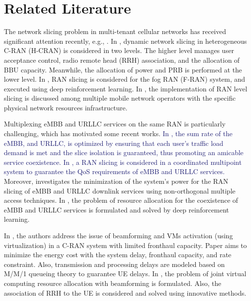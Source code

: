 \documentclass[lettersize,journal]{IEEEtran}
\begin{document}
\section{Related Literature}\label{RL}
The network slicing problem in multi-tenant cellular networks has received significant attention recently, e.g.,  \cite{feng2020dynamic,lee2018dynamic,lee2016new}.
In \cite{lee2018dynamic}, dynamic network slicing in heterogeneous C-RAN (H-CRAN) is considered in two levels. The higher level manages user acceptance control, radio remote head (RRH) association, and the allocation of BBU capacity. Meanwhile, the allocation of power and PRB is performed at the lower level.
In \cite{xiang2020realization}, RAN slicing is considered for the fog RAN (F-RAN) system, and executed using deep reinforcement learning. In \cite{elayoubi20195g,d2020toward}, the implementation of RAN level slicing is discussed among multiple mobile network operators with the specific physical network resources infrastructure.

Multiplexing eMBB and URLLC services on the same RAN is particularly challenging, which has motivated some recent works.
\textcolor{MidnightBlue}{In \cite{setayesh2020joint}, the sum rate of the eMBB, and URLLC, is optimized by ensuring that each user's traffic load demand is met and the slice isolation is guaranteed, thus promoting an amicable service coexistence.
In \cite{yang2020should}, a RAN slicing is considered in a coordinated multipoint system to guarantee the QoS requirements of eMBB and URLLC services.} Moreover, \cite{saggese2021power} investigates the minimization of the system's power for the  RAN slicing of eMBB and URLLC downlink services using non-orthogonal multiple access techniques.
In \cite{alsenwi2021intelligent}, the problem of resource allocation for the coexistence of eMBB and URLLC services is formulated and solved by deep reinforcement learning.
 
In \cite{SystemCostMinimization,guo2016exploiting}, the authors address the issue of beamforming and VMs activation (using virtualization) in a C-RAN system with limited fronthaul capacity.
Paper \cite{SystemCostMinimization} aims to minimize the energy cost with the system delay, fronthaul capacity, and rate constraint.
Also, transmission and processing delays are modeled based on M/M/1 queueing theory to guarantee UE delays.
In \cite{luong2018joint,luong2018novel}, the problem of joint virtual computing resource allocation with beamforming is formulated. Also, the association of RRH to the UE is considered and solved using innovative methods.
\end{document}

